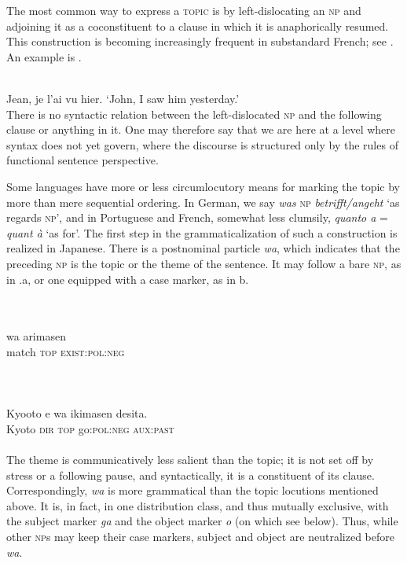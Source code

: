 The most common way to express a \textsc{topic} is by left-dislocating an \textsc{np} and adjoining it as a coconstituent to a clause in which it is anaphorically resumed. This construction is becoming increasingly frequent in substandard French; see \citet{Ashby1981}. An example is .

\ea\label{ex:E92}
\langinfo{\LangFren}{}{}\\
 Jean, je l'ai vu hier.
\glt ‘John, I saw him yesterday.’\\
\z
\noindent There is no syntactic relation between the left-dislocated \textsc{np} and the following clause or anything in it. One may therefore say that we are here at a level where syntax does not yet govern, where the discourse is structured only by the rules of functional sentence perspective.

Some languages have more or less circumlocutory means for marking the topic by more than mere sequential ordering. In German, we say \textit{was} \textsc{np} \textit{betrifft/angeht} ‘as regards \textsc{np}’, and in Portuguese and French, somewhat less clumsily, \textit{quanto a} = \textit{quant à} ‘as for’. The first step in the grammaticalization of such a construction is realized in Japanese. There is a postnominal particle \textit{wa}, which indicates that the preceding \textsc{np} is the topic or the theme of the sentence. It may follow a bare \textsc{np}, as in .a, or one equipped with a case marker, as in b.
 
\ea\label{ex:E93}
\langinfo{\LangJap}{}{} \\
 \ea {}\\
   {wa}  arimasen\\
  {match}  {\textsc{top}}  \textsc{exist}:\textsc{pol}:\textsc{neg}\\
\\
\\
\ex {}\\
\gll  Kyooto  e  wa  ikimasen  desita.\\
  Kyoto   \textsc{dir}   \textsc{top}   go:\textsc{pol}:\textsc{neg}   \textsc{aux}:\textsc{past}\\
\\
\z
\z
\noindent The theme is communicatively less salient than the topic; it is not set off by stress or a following pause, and syntactically, it is a constituent of its clause. Correspondingly, \textit{wa} is more grammatical than the topic locutions mentioned above. It is, in fact, in one distribution class, and thus mutually exclusive, with the subject marker \textit{ga} and the object marker \textit{o} (on which see below). Thus, while other \textsc{np}s may keep their case markers, subject and object are neutralized before \textit{wa}.

